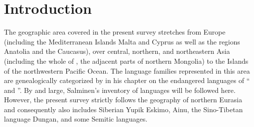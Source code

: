 
\chapter{Introduction}
The geographic area covered in the present survey stretches from Europe (including the Mediterranean Islands Malta and Cyprus as well as the regions Anatolia and the Caucasus), over central, northern, and northeastern Asia (including the whole of , the adjacent parts of northern Mongolia) to the Islands of the northwestern Pacific Ocean. The language families represented in this area are genealogically categorized by \citet{salminen2007} in his chapter on the endangered languages of “ and ”. By and large, Salminen's inventory of languages will be followed here. However, the present survey strictly follows the geography of northern Eurasia and consequently also includes Siberian Yupik Eskimo, Ainu, the Sino-Tibetan language Dungan, and some Semitic languages.

